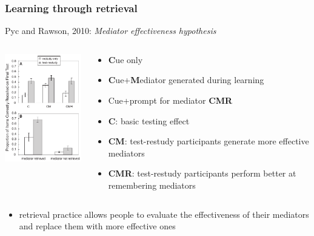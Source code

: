 \documentclass[]{beamer}
\begin{document}
\begin{frame}
 \frametitle{Learning through retrieval}
\begin{overlayarea}{110mm}{80mm}
Pyc and Rawson, 2010: \textit{Mediator effectiveness hypothesis}
\begin{columns}[T]
\begin{column}{40mm}
 \includegraphics[width=45mm]{figs/l10/pyc_rawson_2010.png}
\end{column}

\begin{column}{70mm}
\begin{itemize}
 \item \textbf{C}ue only
 \item \textbf{C}ue+\textbf{M}ediator generated during learning
 \item Cue+prompt for mediator \textbf{CMR}
 \item<2->[$\rightarrow$] \textbf{C}: basic testing effect
 \item<3->[$\rightarrow$] \textbf{CM}: test-restudy participants generate more effective mediators
 \item<4->[$\rightarrow$] \textbf{CMR}: test-restudy participants perform better at remembering mediators
\end{itemize}
 
\end{column}
\end{columns}

\begin{itemize}
 \item<5->[$\Rightarrow$] retrieval practice allows people to evaluate the effectiveness of their mediators and replace them with more effective ones
\end{itemize}
\end{overlayarea}
\end{frame}
\end{document}
